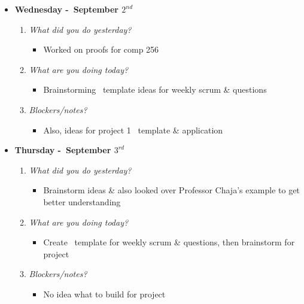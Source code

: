 \begin{itemize}
  \item[] \textbf{\large Wednesday -\ September \(2^{nd}\)}
  \begin{enumerate}
    \item \textsl{What did you do yesterday?}
    \begin{itemize}
      \item Worked on proofs for comp 256
    \end{itemize}
    \item \textsl{What are you doing today?}
    \begin{itemize}
      \item Brainstorming \TEX\ template ideas for weekly scrum \& questions
    \end{itemize}
    \item \textsl{Blockers/notes?}
    \begin{itemize}
      \item Also, ideas for project 1 \TEX\ template \& application
    \end{itemize}
  \end{enumerate}
\end{itemize}
\textbf{}
\begin{itemize}
  \item[] \textbf{\large Thursday -\ September \(3^{rd}\)}
  \begin{enumerate}
    \item \textsl{What did you do yesterday?}
    \begin{itemize}
      \item Brainstorm ideas \& also looked over Professor Chaja's example to get better understanding
    \end{itemize}
    \item \textsl{What are you doing today?}
    \begin{itemize}
      \item Create \TEX\ template for weekly scrum \& questions, then brainstorm for project
    \end{itemize}
    \item \textsl{Blockers/notes?}
    \begin{itemize}
      \item No idea what to build for project
    \end{itemize}
  \end{enumerate}
\end{itemize}
\textbf{}
